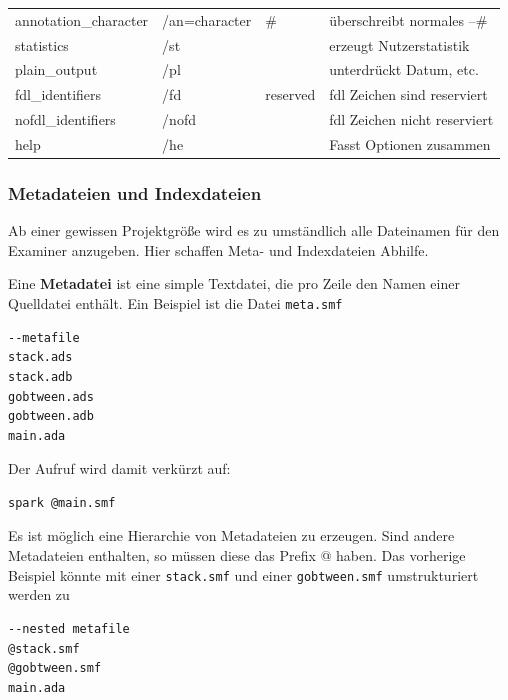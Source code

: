 \begin{footnotesize}
\begin{table}[h!]
\begin{tabular}{|l|l|l|l|}
annotation\_character & /an=character    & \#            & überschreibt normales --\#             \\
statistics            & /st              &               & erzeugt Nutzerstatistik                \\
plain\_output         & /pl              &               & unterdrückt Datum, etc. \\
fdl\_identifiers      & /fd              & reserved      & fdl Zeichen sind reserviert            \\
nofdl\_identifiers    & /nofd            &               & fdl Zeichen nicht reserviert           \\
help                  & /he              &               & Fasst Optionen zusammen                \\ \hline
\end{tabular}
\end{table}
\end{footnotesize}



\subsubsection{Metadateien und Indexdateien}
Ab einer gewissen Projektgröße wird es zu umständlich alle Dateinamen für den Examiner anzugeben. Hier schaffen Meta- und Indexdateien Abhilfe.

Eine \textbf{Metadatei} ist eine simple Textdatei, die pro Zeile den Namen einer Quelldatei enthält. Ein Beispiel ist die Datei \texttt{meta.smf}

\begin{verbatim}
--metafile
stack.ads
stack.adb
gobtween.ads
gobtween.adb
main.ada
\end{verbatim}

Der Aufruf wird damit verkürzt auf:

\begin{verbatim}
spark @main.smf
\end{verbatim}

Es ist möglich eine Hierarchie von Metadateien zu erzeugen. Sind andere Metadateien enthalten, so müssen diese das Prefix @ haben. Das vorherige Beispiel könnte mit einer \texttt{stack.smf} und einer \texttt{gobtween.smf} umstrukturiert werden zu

\begin{verbatim}
--nested metafile
@stack.smf
@gobtween.smf
main.ada
\end{verbatim}

